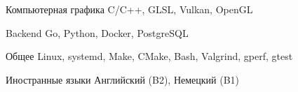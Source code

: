 

\begin{cvskills}

  \cvskill
    {Компьютерная графика} %
    {C/C++, GLSL, Vulkan, OpenGL} %

  \cvskill
    {Backend} %
    {Go, Python, Docker, PostgreSQL} %

  \cvskill
    {Общее} %
    {Linux, systemd, Make, CMake, Bash, Valgrind, gperf, gtest} %

  \cvskill
    {Иностранные языки} %
    {Английский (B2), Немецкий (B1)} %

\end{cvskills}
